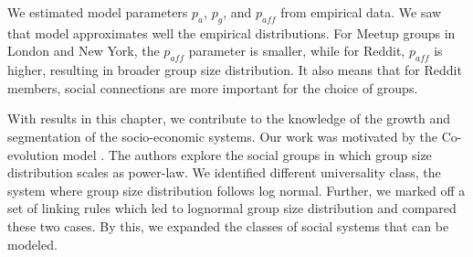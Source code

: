 We estimated model parameters $p_a$, $p_g$, and $p_{aff}$ from empirical data. We saw that model approximates well the empirical distributions. For Meetup groups in London and New York, the $p_{aff}$ parameter is smaller, while for Reddit, $p_{aff}$ is higher, resulting in broader group size distribution. It also means that for Reddit members, social connections are more important for the choice of groups. 

With results in this chapter, we contribute to the knowledge of the growth and segmentation of the socio-economic systems. Our work was motivated by the Co-evolution model \cite{zheleva2009co}. The authors explore the social groups in which group size distribution scales as power-law. We identified different universality class, the system where group size distribution follows log normal. Further, we marked off a set of linking rules which led to lognormal group size distribution and compared these two cases. By this, we expanded the classes of social systems that can be modeled.  









